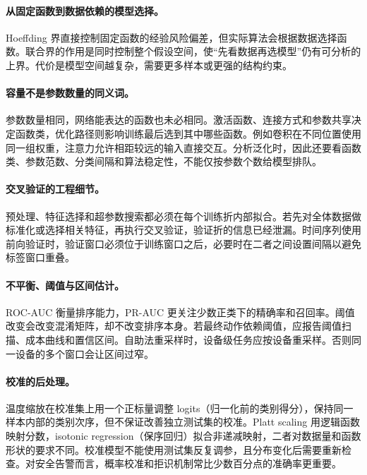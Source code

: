 \paragraph{从固定函数到数据依赖的模型选择。}
Hoeffding 界直接控制固定函数的经验风险偏差，但实际算法会根据数据选择函数。联合界的作用是同时控制整个假设空间，使“先看数据再选模型”仍有可分析的上界。代价是模型空间越复杂，需要更多样本或更强的结构约束。

\paragraph{容量不是参数数量的同义词。}
参数数量相同，网络能表达的函数也未必相同。激活函数、连接方式和参数共享决定函数类，优化路径则影响训练最后选到其中哪些函数。例如卷积在不同位置使用同一组权重，注意力允许相距较远的输入直接交互。分析泛化时，因此还要看函数类、参数范数、分类间隔和算法稳定性，不能仅按参数个数给模型排队。

\paragraph{交叉验证的工程细节。}
预处理、特征选择和超参数搜索都必须在每个训练折内部拟合。若先对全体数据做标准化或选择相关特征，再执行交叉验证，验证折的信息已经泄漏。时间序列使用前向验证时，验证窗口必须位于训练窗口之后，必要时在二者之间设置间隔以避免标签窗口重叠。

\paragraph{不平衡、阈值与区间估计。}
ROC-AUC 衡量排序能力，PR-AUC 更关注少数正类下的精确率和召回率。阈值改变会改变混淆矩阵，却不改变排序本身。若最终动作依赖阈值，应报告阈值扫描、成本曲线和置信区间。自助法重采样时，设备级任务应按设备重采样。否则同一设备的多个窗口会让区间过窄。

\paragraph{校准的后处理。}
温度缩放在校准集上用一个正标量调整 logits（归一化前的类别得分），保持同一样本内部的类别次序，但不保证改善独立测试集的校准。Platt scaling 用逻辑函数映射分数，isotonic regression（保序回归）拟合非递减映射，二者对数据量和函数形状的要求不同。校准模型不能使用测试集反复调参，且分布变化后需要重新检查。对安全告警而言，概率校准和拒识机制常比少数百分点的准确率更重要。


